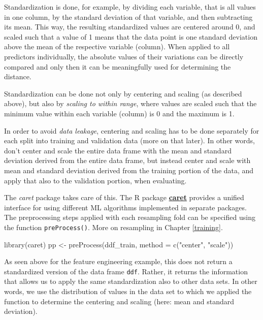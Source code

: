 \documentclass[
]{book}
\newenvironment{Shaded}{\begin{snugshade}}{\end{snugshade}}
\newcommand{\AttributeTok}[1]{\textcolor[rgb]{0.77,0.63,0.00}{#1}}
\newcommand{\FunctionTok}[1]{\textcolor[rgb]{0.00,0.00,0.00}{#1}}
\newcommand{\NormalTok}[1]{#1}
\newcommand{\OtherTok}[1]{\textcolor[rgb]{0.56,0.35,0.01}{#1}}
\newcommand{\StringTok}[1]{\textcolor[rgb]{0.31,0.60,0.02}{#1}}
\begin{document}
Standardization is done, for example, by dividing each variable, that is all values in one column, by the standard deviation of that variable, and then subtracting its mean. This way, the resulting standardized values are centered around 0, and scaled such that a value of 1 means that the data point is one standard deviation above the mean of the respective variable (column). When applied to all predictors individually, the absolute values of their variations can be directly compared and only then it can be meaningfully used for determining the distance.

Standardization can be done not only by centering and scaling (as described above), but also by \emph{scaling to within range}, where values are scaled such that the minimum value within each variable (column) is 0 and the maximum is 1.

In order to avoid \emph{data leakage}, centering and scaling has to be done separately for each split into training and validation data (more on that later). In other words, don't center and scale the entire data frame with the mean and standard deviation derived from the entire data frame, but instead center and scale with mean and standard deviation derived from the training portion of the data, and apply that also to the validation portion, when evaluating.

The \emph{caret} package takes care of this. The R package \href{https://topepo.github.io/caret/}{\textbf{caret}} provides a unified interface for using different ML algorithms implemented in separate packages. The preprocessing steps applied with each resampling fold can be specified using the function \texttt{preProcess()}. More on resampling in Chapter \ref{training}.

\begin{Shaded}
\begin{Highlighting}[]
\FunctionTok{library}\NormalTok{(caret)}
\NormalTok{pp }\OtherTok{\textless{}{-}} \FunctionTok{preProcess}\NormalTok{(ddf\_train, }\AttributeTok{method =} \FunctionTok{c}\NormalTok{(}\StringTok{"center"}\NormalTok{, }\StringTok{"scale"}\NormalTok{))}
\end{Highlighting}
\end{Shaded}

As seen above for the feature engineering example, this does not return a standardized version of the data frame \texttt{ddf}. Rather, it returns the information that allows us to apply the same standardization also to other data sets. In other words, we use the distribution of values in the data set to which we applied the function to determine the centering and scaling (here: mean and standard deviation).
\end{document}
